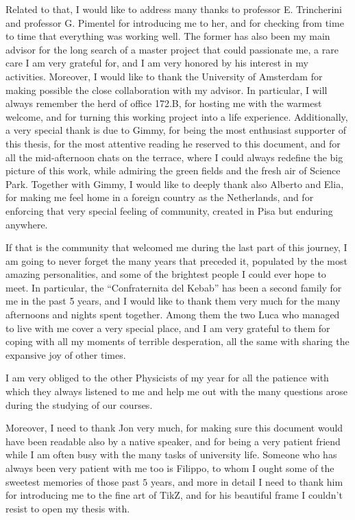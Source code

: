 Related to that, I would like to address many thanks to professor E. Trincherini and professor G. Pimentel for introducing me to her, and for checking from time to time that everything was working well. The former has also been my main advisor for the long search of a master project that could passionate me, a rare care I am very grateful for, and I am very honored by his interest in my activities. 
Moreover, I would like to thank the University of Amsterdam for making possible the close collaboration with my advisor. In particular, I will always remember the herd of office 172.B, for hosting me with the warmest welcome, and for turning this working project into a life experience.
Additionally, a very special thank is due to Gimmy, for being the most enthusiast supporter of this thesis, for the most attentive reading he reserved to this document, and for all the mid-afternoon chats on the terrace, where I could always redefine the big picture of this work, while admiring  the green fields and the fresh air of Science Park.
Together with Gimmy, I would like to deeply thank also Alberto and Elia, for making me feel home in a foreign country as the Netherlands, and for enforcing that very special feeling of community, created in Pisa but enduring anywhere.

If that is the community that welcomed me during the last part of this journey, I am going to never forget the many years that preceded it, populated by the most amazing personalities, and some of the brightest people I could ever hope to meet. In particular, the ``Confraternita del Kebab'' has been a second family for me in the past 5 years, and I would like to thank them very much for the many afternoons and nights spent together.
Among them the two Luca who managed to live with me cover a very special place, and I am very grateful to them for coping with all my moments of terrible desperation, all the same with sharing the expansive joy of other times.

I am very obliged to the other Physicists of my year for all the patience with which they always listened to me and help me out with the many questions arose during the studying of our courses. 

Moreover, I need to thank Jon very much, for making sure this document would have been readable also by a native speaker, and for being a very patient friend while I am often busy with the many tasks of university life. Someone who has always been very patient with me too is Filippo, to whom I ought some of the sweetest memories of those past \(5\) years, and more in detail I need to thank him for introducing me to the fine art of TikZ, and for his beautiful frame I couldn't resist to open my thesis with.

